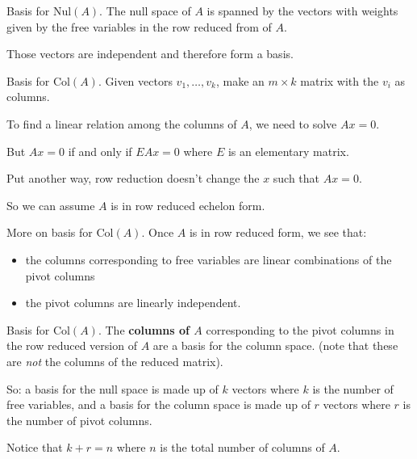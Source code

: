 \documentclass[
  ignorenonframetext,
]{beamer}
\begin{document}
\begin{frame}{Basis for \(\mathrm{Nul}(A)\).}
\label{basis-for-mathrmnula.}
The null space of \(A\) is spanned by the vectors with weights given by
the free variables in the row reduced from of \(A\).

Those vectors are independent and therefore form a basis.
\end{frame}

\begin{frame}{Basis for \(\mathrm{Col}(A)\).}
\label{basis-for-mathrmcola.}
Given vectors \(v_1,\ldots, v_k\), make an \(m\times k\) matrix with the
\(v_{i}\) as columns.

To find a linear relation among the columns of \(A\), we need to solve
\(Ax=0\).

But \(Ax=0\) if and only if \(EAx=0\) where \(E\) is an elementary
matrix.

Put another way, row reduction doesn't change the \(x\) such that
\(Ax=0\).

So we can assume \(A\) is in row reduced echelon form.
\end{frame}

\begin{frame}{More on basis for \(\mathrm{Col}(A)\).}
\label{more-on-basis-for-mathrmcola.}
Once \(A\) is in row reduced form, we see that:

\begin{itemize}
\item
  the columns corresponding to free variables are linear combinations of
  the pivot columns
\item
  the pivot columns are linearly independent.
\end{itemize}
\end{frame}

\begin{frame}{Basis for \(\mathrm{Col}(A)\).}
\label{basis-for-mathrmcola.-1}
The \textbf{columns of \(A\)} corresponding to the pivot columns in the
row reduced version of \(A\) are a basis for the column space. (note
that these are \emph{not} the columns of the reduced matrix).

So: a basis for the null space is made up of \(k\) vectors where \(k\)
is the number of free variables, and a basis for the column space is
made up of \(r\) vectors where \(r\) is the number of pivot columns.

Notice that \(k+r=n\) where \(n\) is the total number of columns of
\(A\).
\end{frame}
\end{document}
